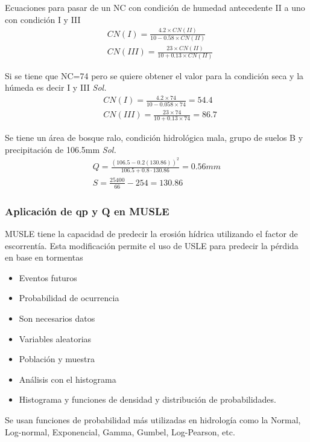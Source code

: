    Ecuaciones para pasar de un NC con condición de humedad antecedente II a uno con condición I y III
    \begin{align}
        &CN(I) = \frac{4.2\times CN(II)}{10 -0.58\times CN(II)}\\
        &CN(III) = \frac{23\times CN(II)}{10 + 0.13\times CN(II)}
    \end{align}
    \begin{example}
        Si se tiene que NC=74 pero se quiere obtener el valor para la condición seca y la húmeda es decir I y III
        \textit{ Sol. }
        \begin{align*}
            &CN(I) = \frac{4.2\times 74}{10 -0.058\times 74} = 54.4\\
            &CN(III) = \frac{23\times 74}{10 + 0.13\times 74} = 86.7
        \end{align*}
    \end{example}
    \begin{example}
        Se tiene un área de bosque ralo, condición hidrológica mala, grupo de suelos B y precipitación de 106.5mm
        \textit{ Sol. }
        \begin{align*}
            Q = \frac{\left(106.5 - 0.2(130.86)\right)^2}{106.5 + 0.8 \cdot 130.86} = 0.56mm\\
            S = \frac{25400}{66} - 254 = 130.86
        \end{align*}
    \end{example}
    \subsubsection{Aplicación de qp y Q en MUSLE}
    MUSLE tiene la capacidad de predecir la erosión hídrica utilizando el factor de escorrentía. Esta modificación permite el uso de USLE para predecir la pérdida en base en tormentas
    \begin{itemize}
        \item Eventos futuros
        \item Probabilidad de ocurrencia
        \item Son necesarios datos
        \item Variables aleatorias
        \item Población y muestra
        \item Análisis con el histograma
        \item Histograma y funciones de densidad y distribución de probabilidades.
    \end{itemize}
    Se usan funciones de probabilidad más utilizadas en hidrología como la Normal, Log-normal, Exponencial, Gamma, Gumbel, Log-Pearson, etc.
    
